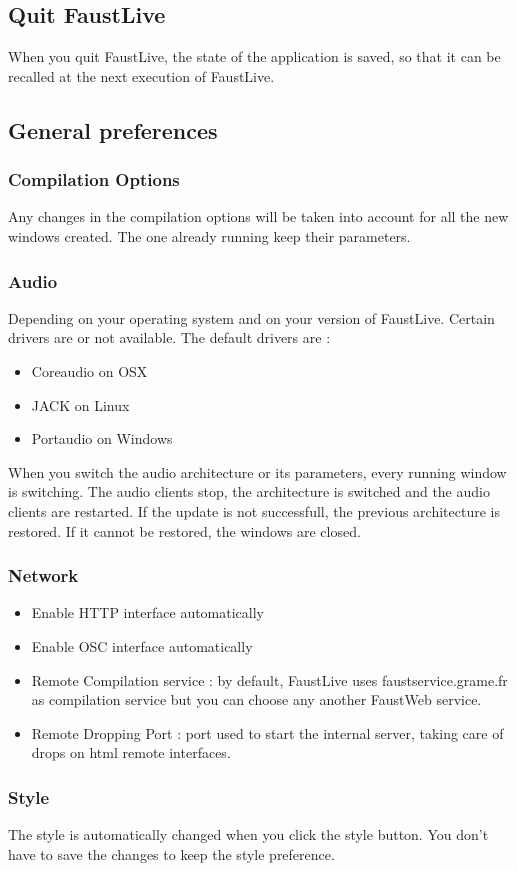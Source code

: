 \documentclass[a4paper]{article}
\begin{document}
\subsection{Quit FaustLive}

When you quit FaustLive, the state of the application is saved, so that it can be recalled at the next execution of FaustLive.

\subsection{General preferences}
\subsubsection{Compilation Options}
Any changes in the compilation options will be taken into account for all the new windows created. The one already running keep their parameters.
\subsubsection{Audio}
 
Depending on your operating system and on your version of FaustLive. Certain drivers are or not available.
The default drivers are :
\begin{itemize}
\item Coreaudio on OSX
\item JACK on Linux
\item Portaudio on Windows
\end{itemize}

When you switch the audio architecture or its parameters, every running window is switching. The audio clients stop, the architecture is switched and the audio clients are restarted. If the update is not successfull, the previous architecture is restored. If it cannot be restored, the windows are closed. 

\subsubsection{Network}
\begin{itemize}
\item Enable HTTP interface automatically
\item Enable OSC interface automatically
\item Remote Compilation service : by default, FaustLive uses faustservice.grame.fr as compilation service but you can choose any another FaustWeb service.
\item Remote Dropping Port : port used to start the internal server, taking care of drops on html remote interfaces.

\end{itemize}

\subsubsection{Style}
The style is automatically changed when you click the style button. You don't have to save the changes to keep the style preference. 

%
\end{document}
